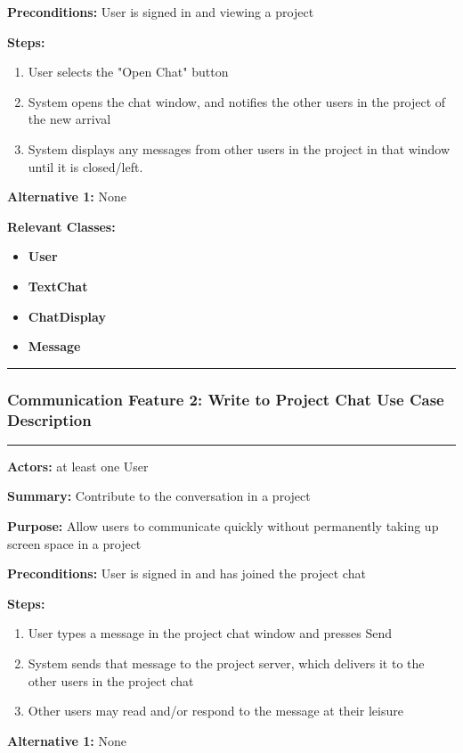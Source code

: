 \documentclass[twoside,letterpaper]{article}
\begin{document}
	\noindent\textbf{Preconditions:} User is signed in and viewing a project \newline
	
	\noindent\textbf{Steps:} \begin{enumerate}
		\item User selects the "Open Chat" button
		\item System opens the chat window, and notifies the other users in the project of the new arrival
		\item System displays any messages from other users in the project in that window until it is closed/left.
	\end{enumerate}
	\noindent\textbf{Alternative 1:} None \newline
	
	
	\noindent\textbf{Relevant Classes:}
	\begin{itemize}
		\item \textbf{User}
		\item \textbf{TextChat}
		\item \textbf{ChatDisplay}
		\item \textbf{Message}
	\end{itemize}
	\hrule
	\newpage
	
	
	\subsubsection[Communication Feature 2: Write to Project Chat Use Case Description]{\rmfamily\bfseries\color{black}
		Communication Feature 2: Write to Project Chat Use Case Description}
	\hypertarget{RefHeading22059017292}{}
	
	\vspace{2pt}
	\hrule
	\vspace{8pt}
	\textbf{Actors:} at least one User \newline
	
	\noindent\textbf{Summary:} Contribute to the conversation in a project  \newline
	
	\noindent\textbf{Purpose:} Allow users to communicate quickly without permanently taking up screen space in a project \newline
	
	\noindent\textbf{Preconditions:} User is signed in and has joined the project chat \newline
	
	\noindent\textbf{Steps:} \begin{enumerate}
		\item User types a message in the project chat window and presses Send
		\item System sends that message to the project server, which delivers it to the other users in the project chat
		\item Other users may read and/or respond to the message at their leisure
	\end{enumerate}
	\noindent\textbf{Alternative 1:} None \newline
	
\end{document}
